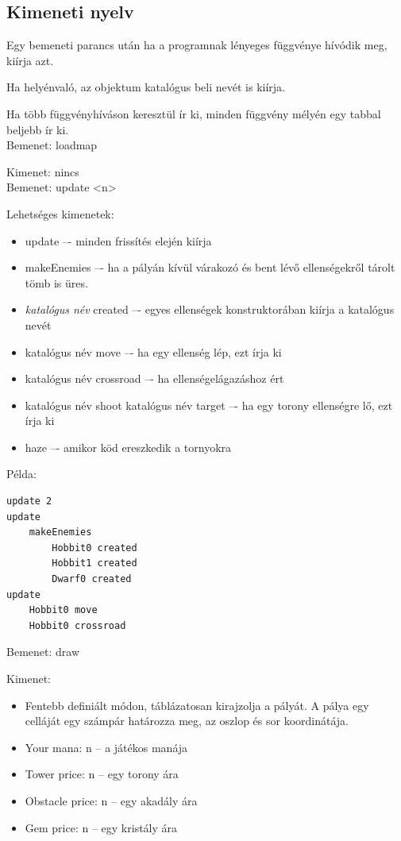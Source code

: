 \subsection{Kimeneti nyelv}

Egy bemeneti parancs után ha a programnak lényeges függvénye hívódik meg, kiírja azt.

Ha helyénvaló, az objektum katalógus beli nevét is kiírja.

Ha több függvényhíváson keresztül ír ki, minden függvény mélyén egy tabbal beljebb ír ki.
\\[12pt]
Bemenet: loadmap

Kimenet: nincs
\\[6pt]

Bemenet: update <n>

Lehetséges kimenetek: 
\begin{itemize}
\item update –- minden frissítés elején kiírja
\item makeEnemies –- ha a pályán kívül várakozó és bent lévő ellenségekről tárolt tömb is üres.
\item \emph{katalógus név}  created –- egyes ellenségek konstruktorában kiírja a katalógus nevét
\item katalógus név move –- ha egy ellenség lép, ezt írja ki
\item katalógus név crossroad –- ha ellenségelágazáshoz ért
\item katalógus név shoot katalógus név target –- ha egy torony ellenségre lő, ezt írja ki
\item haze –- amikor köd ereszkedik a tornyokra  
\end{itemize}

Példa: 
\begin{lstlisting}
update 2
update
	makeEnemies
		Hobbit0 created
		Hobbit1 created
		Dwarf0 created
update
	Hobbit0 move
	Hobbit0 crossroad
\end{lstlisting}

Bemenet: draw

Kimenet: 
\begin{itemize}
\item Fentebb definiált módon, táblázatosan kirajzolja a pályát. A pálya egy celláját egy számpár határozza meg, az oszlop és sor koordinátája.
\item Your mana: n – a játékos manája
\item Tower price: n –  egy torony ára
\item Obstacle price: n – egy akadály ára
\item Gem price: n – egy kristály ára
\end{itemize} 


